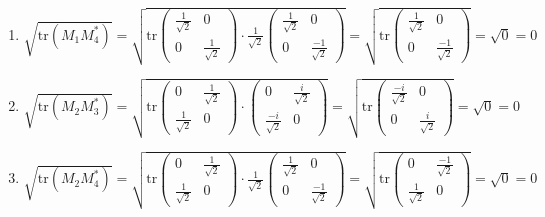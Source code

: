 \documentclass{report}
\begin{document}
\begin{enumerate}
\begin{enumerate}[label=\alph*)]
\begin{enumerate}
    
    
    
    
    
    
    
    \item $\sqrt{\text{tr}(M_1 M_4^*)} = \sqrt{\text{tr}  \begin{pmatrix}
    \frac{1}{\sqrt{2}} & 0\\
    0 & \frac{1}{\sqrt{2}}
    \end{pmatrix} \cdot \frac{1}{\sqrt{2}}\begin{pmatrix}
    \frac{1}{\sqrt{2}} & 0\\
    0 & \frac{-1}{\sqrt{2}}
    \end{pmatrix}}= \sqrt{\text{tr}   \begin{pmatrix}
    \frac{1}{\sqrt{2}} & 0\\
    0 & \frac{-1}{\sqrt{2}}
    \end{pmatrix}} = \sqrt{0} = 0 $
    
    
     
    
     
    \item $\sqrt{\text{tr}(M_2 M_3^*)} = \sqrt{\text{tr} \begin{pmatrix}
    0 & \frac{1}{\sqrt{2}}\\
    \frac{1}{\sqrt{2}} & 0
    \end{pmatrix} \cdot \begin{pmatrix}
    0 & \frac{i}{\sqrt{2}}\\
    \frac{-i}{\sqrt{2}} & 0
    \end{pmatrix}  }= \sqrt{\text{tr}  \begin{pmatrix}
    \frac{-i}{\sqrt{2}} & 0\\
    0 & \frac{i}{\sqrt{2}}
    \end{pmatrix}} = \sqrt{0} = 0 $
    
    
    
    \item $\sqrt{\text{tr}(M_2 M_4^*)} = \sqrt{\text{tr} \begin{pmatrix}
    0 & \frac{1}{\sqrt{2}}\\
    \frac{1}{\sqrt{2}} & 0
    \end{pmatrix} \cdot \frac{1}{\sqrt{2}}\begin{pmatrix}
    \frac{1}{\sqrt{2}} & 0\\
    0 & \frac{-1}{\sqrt{2}}
    \end{pmatrix}  }= \sqrt{\text{tr}  \begin{pmatrix}
    0 & \frac{-1}{\sqrt{2}}\\
    \frac{1}{\sqrt{2}} & 0
    \end{pmatrix} } = \sqrt{0} = 0 $
    

\end{enumerate}
\end{enumerate}
\end{enumerate}
\end{document}
